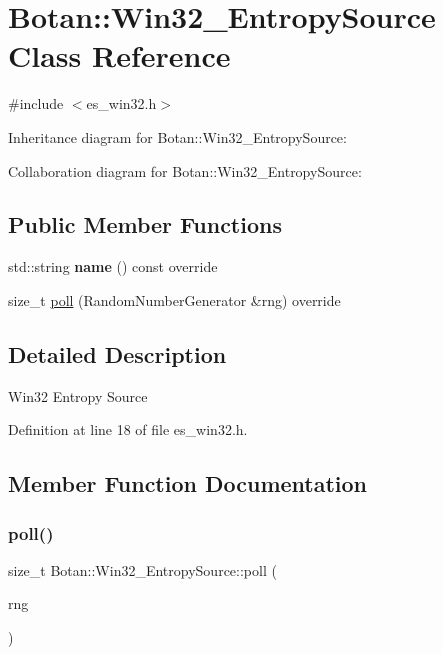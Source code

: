 \hypertarget{class_botan_1_1_win32___entropy_source}{}\section{Botan\+:\+:Win32\+\_\+\+Entropy\+Source Class Reference}
\label{class_botan_1_1_win32___entropy_source}


{\ttfamily \#include $<$es\+\_\+win32.\+h$>$}



Inheritance diagram for Botan\+:\+:Win32\+\_\+\+Entropy\+Source\+:


Collaboration diagram for Botan\+:\+:Win32\+\_\+\+Entropy\+Source\+:
\subsection*{Public Member Functions}
\begin{DoxyCompactItemize}
\item 
\mbox{\label{class_botan_1_1_win32___entropy_source_a2cdec8d69dfe7689ab5382725ae1fd46}} 
std\+::string {\bfseries name} () const override
\item 
size\+\_\+t \mbox{\hyperlink{class_botan_1_1_win32___entropy_source_a5d3f6ff3ce021819a2bedc0e458898ce}{poll}} (Random\+Number\+Generator \&rng) override
\end{DoxyCompactItemize}


\subsection{Detailed Description}
Win32 Entropy Source 

Definition at line 18 of file es\+\_\+win32.\+h.



\subsection{Member Function Documentation}
\mbox{\label{class_botan_1_1_win32___entropy_source_a5d3f6ff3ce021819a2bedc0e458898ce}} 
\subsubsection{\texorpdfstring{poll()}{poll()}}
{\footnotesize\ttfamily size\+\_\+t Botan\+::\+Win32\+\_\+\+Entropy\+Source\+::poll (\begin{DoxyParamCaption}\item[{Random\+Number\+Generator \&}]{rng }\end{DoxyParamCaption})\hspace{0.3cm}{\ttfamily [override]}}

